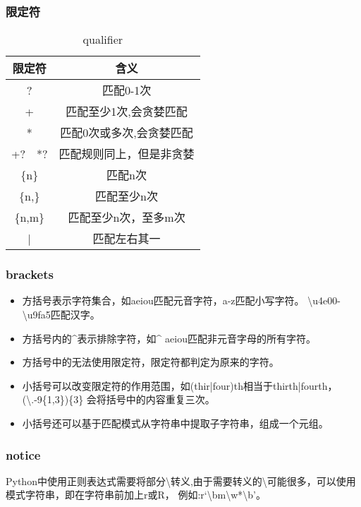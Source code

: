     \subsubsection{限定符}
      \begin{table}[H]
        \centering
        \caption{qualifier}
        \label{tab:qualifier}
        \begin{tabular}{cc}
          \toprule[1.5pt]
          限定符 & 含义 \\
          \midrule
          ? & 匹配0-1次 \\
          + & 匹配至少1次,会贪婪匹配 \\
          * & 匹配0次或多次,会贪婪匹配 \\
          +?~~*? & 匹配规则同上，但是非贪婪 \\
          \{n\} & 匹配n次 \\
          \{n,\} & 匹配至少n次 \\
          \{n,m\} & 匹配至少n次，至多m次 \\
          | & 匹配左右其一 \\
          \bottomrule[1.5pt]
        \end{tabular}
      \end{table}

    \subsubsection{brackets}
      \begin{itemize}
        \item 方括号表示字符集合，如\lbrack aeiou\rbrack 匹配元音字符，\lbrack a-z\rbrack 匹配小写字符。
          \lbrack\textbackslash u4e00-\textbackslash u9fa5\rbrack 匹配汉字。
        \item 方括号内的\^{}表示排除字符，如\lbrack\^{} aeiou\rbrack 匹配非元音字母的所有字符。
        \item 方括号中的无法使用限定符，限定符都判定为原来的字符。
        \item 小括号可以改变限定符的作用范围，如(thir|four)th相当于thirth|fourth，(\textbackslash .-9\rbrack\{1,3\})\{3\}
          会将括号中的内容重复三次。
        \item 小括号还可以基于匹配模式从字符串中提取子字符串，组成一个元组。
      \end{itemize}

    \subsubsection{notice}
      Python中使用正则表达式需要将部分\textbackslash 转义,由于需要转义的\textbackslash 可能很多，可以使用模式字符串，即在字符串前加上r或R，
      例如:r`\textbackslash bm\textbackslash w*\textbackslash b'。


